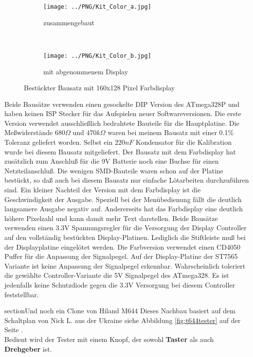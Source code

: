 \begin{figure}[H]
  \begin{subfigure}[b]{.5\textwidth}	%
    \centering
    \texttt{[image: ../PNG/Kit\_Color\_a.jpg]}	%
    \caption{zusammengebaut}
  \end{subfigure}
  ~
  \begin{subfigure}[b]{.5\textwidth}	%
    \centering
    \texttt{[image: ../PNG/Kit\_Color\_b.jpg]}	%
    \caption{mit abgenommenem Display}
  \end{subfigure}
  \caption{Bestückter Bausatz mit 160x128 Pixel Farbdisplay}
  \label{fig:Kit_color}
\end{figure}

Beide Bausätze verwenden einen gesockelte DIP Version des ATmega328P und haben keinen 
ISP Stecker für das Aufspielen neuer Softwareversionen.
Die erste Version verwendet
ausschließlich bedrahtete Bauteile für die Hauptplatine. Die Meßwiderstände \(680\Omega\) und \(470k\Omega\)
waren bei meinem Bausatz mit einer 0.1\% Toleranz geliefert worden.
Selbst ein \(220 nF\) Kondensator für die Kalibration wurde bei diesem Bausatz mitgeliefert.
Der Bausatz mit dem Farbdisplay hat zusätzlich zum Anschluß für die 9V Batterie noch eine Buchse
für einen Netzteilanschluß. Die wenigen SMD-Bauteile waren schon auf der Platine bestückt,
so daß auch bei diesem Bausatz nur einfache Lötarbeiten durchzuführen sind.
Ein kleiner Nachteil der Version mit dem Farbdisplay ist die Geschwindigkeit der Ausgabe.
Speziell bei der Menübedienung fällt die deutlich langsamere Ausgabe negativ auf.
Andererseits hat das Farbdisplay eine deutlich höhere Pixelzahl und kann damit mehr Text darstellen. 
Beide Bausätze verwenden einen 3.3V Spannungsregler für die Versorgung der Display Controller auf
den vollständig bestückten Display-Platinen. Lediglich die Stiftleiste muß bei
der Displayplatine eingelötet werden.
Die Farbversion verwendet einen CD4050 Puffer für die Anpassung der Signalpegel.
Auf der Display-Platine der ST7565 Variante ist keine Anpassung der Signalpegel erkennbar.
Wahrscheinlich toleriert die gewählte Controller-Variante die 5V Signalpegel des ATmega328.
Es ist jedenfalls keine Schutzdiode gegen die 3.3V Versorgung bei diesem Controller feststellbar.

section{Und noch ein Clone von Hiland M644}
Dieses Nachbau basiert auf dem Schaltplan von Nick L. aus der Ukraine siehe Abbildung \ref{fig:t644tester}
auf der Seite \pageref{fig:t644tester}.\\
Bedient wird der Tester mit einem Knopf, der sowohl \textbf {Taster} als auch \textbf {Drehgeber} ist.

